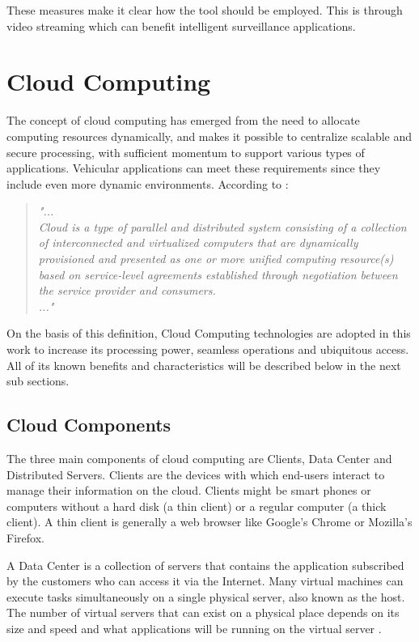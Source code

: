 These measures make it clear how the tool should be employed. This is through video streaming which can benefit intelligent surveillance applications.


\section{Cloud Computing}

The concept of cloud computing has emerged from the need to allocate computing resources dynamically, and makes it possible to centralize scalable and secure processing, with sufficient momentum to support various types of applications. Vehicular applications can meet these requirements since they include even more dynamic environments. 
According to \cite{Buyya2009}:

\begin{quotation}
\textit{"...\\Cloud is a type of parallel and distributed system consisting of a collection of interconnected and virtualized computers that are dynamically provisioned and presented as one or more unified computing resource(s) based on service-level agreements established through negotiation between the service provider and consumers.\\..."}
\end{quotation}


On the basis of this definition, Cloud Computing technologies are adopted in this work to increase its processing power, seamless operations and ubiquitous access. All of its known benefits and characteristics will be described below in the next sub sections.

\subsection{Cloud Components}

The three main components of cloud computing are Clients, Data Center and Distributed Servers\cite{Velte2009}.
Clients are the devices with which end-users interact to manage their information on the cloud. Clients might be smart phones or computers without a hard disk (a thin client) or a regular computer (a thick client). A thin client is generally a web browser like Google's Chrome or Mozilla's Firefox. 

A Data Center is a collection of servers that contains the application subscribed by the customers who can access it via the Internet. Many virtual machines can execute tasks simultaneously on a single physical server, also known as the host. The number of virtual servers that can exist on a physical place depends on its size and speed and what applications will be running on the virtual server \cite{Velte2009}. 


